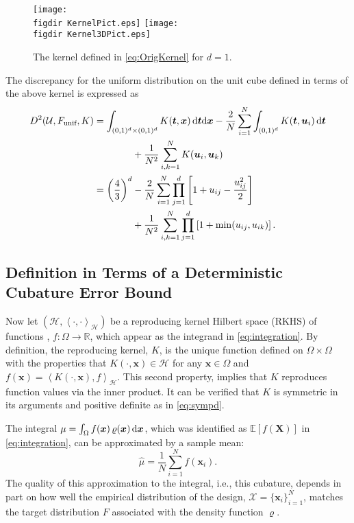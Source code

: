\documentclass[graybox]{svmult}
\newcommand{\vx}{\boldsymbol{x}}
\newcommand{\vX}{\boldsymbol{X}}
\newcommand{\vt}{\boldsymbol{t}}
\newcommand{\vu}{\boldsymbol{u}}
\newcommand{\dif}{{\rm d}}
\newcommand{\Udes}{\mathcal{U}}
\newcommand{\Xdes}{\mathcal{X}}
\newcommand{\ch}{\mathcal{H}}
\newcommand{\Ex}{\mathbb{E}}
\newcommand{\ip}[3][{}]{\ensuremath{\left \langle #2, #3 \right \rangle_{#1}}}
\newcommand{\unif}{\textup{unif}}
\newcommand{\figdir}{code/} %
\begin{document}
\begin{figure}
    \centering
    \texttt{[image: \\figdir KernelPict.eps]} \qquad
    \texttt{[image: \\figdir Kernel3DPict.eps]}
    \caption{The kernel defined in \eqref{eq:OrigKernel} for $d=1$.}
    \label{fig:kernelpict}
\end{figure}

The discrepancy for the uniform distribution on the unit cube defined in terms of the above kernel is expressed as
\begin{align} 
\nonumber
    D^2(\Udes,F_\unif,K)
    & = \int_{(0,1)^d \times (0,1)^d} K(\vt,\vx) \, \dif \vt \dif \vx - \frac 2N \sum_{i=1}^N \int_{(0,1)^d} K(\vt,\vu_i) \, \dif \vt\\
    \nonumber
    & \qquad \qquad  + \frac{1}{N^2} \sum_{i,k=1}^N K(\vu_i,\vu_k) \\
    \nonumber
    & = \left( \frac 43 \right)^d 
     - \frac 2N \sum_{i=1}^N \prod_{j=1}^d \left[1 + u_{ij} - \frac{u_{ij}^2}{2} \right] \\
     \nonumber
     & \qquad \qquad + \frac 1{N^2} \sum_{i,k=1}^N \prod_{j=1}^d \left[1+ \min(u_{ij},u_{ik})\right].
\end{align}



\subsection{Definition in Terms of a Deterministic Cubature Error Bound}
\label{sec:DetermBound}

Now let $(\ch, \ip[\ch]{\cdot}{\cdot})$ be a reproducing kernel Hilbert space (RKHS) of functions \cite{Aro50}, $f: \Omega \rightarrow \mathbb{R}$, which appear as the integrand in \eqref{eq:integration}. By definition, the reproducing kernel, $K$, is the unique function defined on $\Omega \times \Omega$ with the properties that $K(\cdot, \vx)\in \ch$ for any $\vx \in \Omega$ and $f(\vx)=\ip[\ch]{K(\cdot,\vx)}{f}$.  This second property, implies that $K$ reproduces function values via the inner product. It can be verified that $K$ is symmetric in its arguments and positive definite as in \eqref{eq:sympd}.

The integral $\mu = \int_{\Omega} f(\vx) \, \varrho(\vx) \, \dif \vx$, which was identified as $\Ex[f(\vX)]$ in \eqref{eq:integration}, can be approximated by a sample mean:
\begin{equation}\label{eq:cubature}
\hat{\mu}=\frac{1}{N}\sum_{i=1}^N f(\vx_i).
\end{equation}
The quality of this approximation to the integral, i.e., this cubature, depends in part on how well the empirical distribution of the design, $\Xdes = \{\vx_i\}_{i=1}^N$, matches the target distribution $F$ associated with the density function $\varrho$. 
\end{document}
